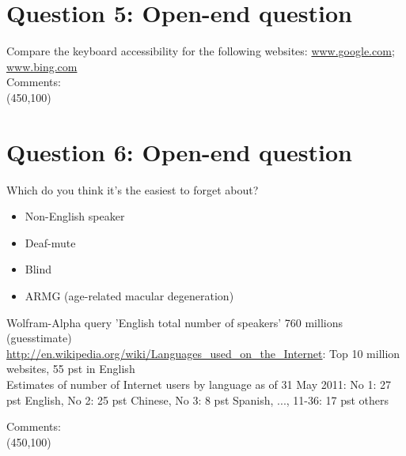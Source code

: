 \documentclass[12pt,a4paper,norsk]{article}
\begin{document}
\section {Question 5: Open-end question} Compare the keyboard accessibility for the following websites:
\url{www.google.com}; \url{www.bing.com} \\

\noindent Comments:\\
\framebox(450,100){}\\

\section {Question 6: Open-end question} Which do you think it’s the easiest to forget about?

\begin{itemize}
 \item Non-English speaker
 \item Deaf-mute
 \item Blind
 \item ARMG (age-related macular degeneration)
\end{itemize}

Wolfram-Alpha query 'English total number of speakers' 760 millions (guesstimate) \\
\url{http://en.wikipedia.org/wiki/Languages_used_on_the_Internet}: Top 10 million websites, 55 pst in English \\
Estimates of number of Internet users by language as of 31 May 2011: No 1: 27 pst English, No 2: 25 pst Chinese, No 3: 8 pst Spanish, ..., 11-36: 17 pst others


\noindent Comments:\\
\framebox(450,100){}\\
\end{document}
